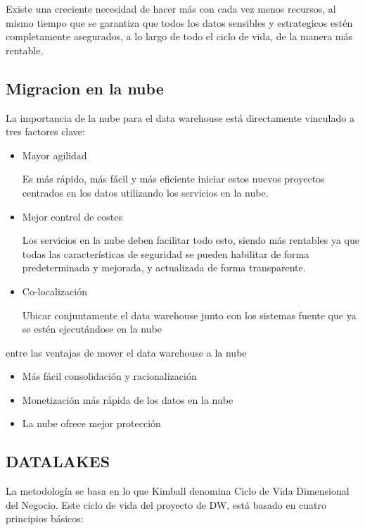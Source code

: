 \documentclass[%
 reprint,
 amsmath,amssymb,
 aps,
]{revtex4-1}
\begin{document}
Existe una creciente necesidad de hacer más con cada vez menos recursos, al mismo tiempo que se garantiza que todos los datos sensibles y estrategicos estén completamente asegurados, a lo largo de todo el ciclo de vida, de la manera más rentable.\cite{robles1}
	

\subsection{Migracion en la nube}

La importancia de la nube para el data warehouse está directamente vinculado a tres factores clave:

\begin{itemize}
	\item Mayor agilidad

Es más rápido, más fácil y más eficiente iniciar estos nuevos proyectos centrados en los datos utilizando los servicios en la nube.

	\item Mejor control de costes

Los servicios en la nube deben facilitar todo esto, siendo más rentables ya que todas las características de seguridad se pueden habilitar de forma predeterminada y mejorada, y actualizada de forma transparente.

	\item Co-localización

Ubicar conjuntamente el data warehouse junto con los sistemas fuente que ya se estén ejecutándose en la nube
\end{itemize}

entre las ventajas de mover el data warehouse a la nube

\begin{itemize}
	\item Más fácil consolidación y racionalización
	\item Monetización más rápida de los datos en la nube
	\item La nube ofrece mejor protección
\end{itemize}

\subsection{DATALAKES}	
La metodología se basa en lo que Kimball denomina Ciclo de Vida Dimensional del Negocio. Este ciclo de vida del proyecto de DW, está basado en cuatro principios básicos: 
\end{document}
